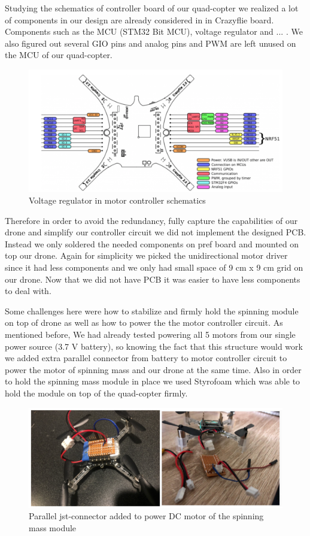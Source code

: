 Studying the schematics of controller board of our quad-copter we realized a lot of components in our design are already considered in in Crazyflie board. Components such as the MCU (STM32 Bit MCU), voltage regulator and ... . We also figured out several GIO pins and analog pins and PWM are left unused on the MCU of our quad-copter. 

\begin{figure}[H]
\centering
\includegraphics[width=1\textwidth]{./Amir_img/cfPinOut.png}
\caption{Voltage regulator in motor controller schematics }
\end{figure} 

Therefore in order to avoid the redundancy, fully capture the capabilities of our drone and simplify our controller circuit we did not implement the designed PCB.   
Instead we only soldered the needed components on pref board and mounted on top our drone. Again for simplicity we picked the unidirectional motor driver since it had less components and we only had small space of 9 cm x 9 cm grid on our drone. Now that we did not have PCB it was easier to have less components to deal with. 

Some challenges here were how to stabilize and firmly hold the spinning module on top of drone as well as how to power the the motor controller circuit.
As mentioned before, We had already tested powering all 5 motors from our single power source (3.7 V battery), so knowing the fact that this structure would work we added extra parallel connector from battery to motor controller circuit to power the motor of spinning mass and our drone at the same time. 
Also in order to hold the spinning mass module in place we used Styrofoam which was able to hold the module on top of the quad-copter firmly. 
\begin{figure}[H]
\centering
\includegraphics[width=1\textwidth]{./Amir_img/jstConnect.png}
\caption{Parallel jst-connector added to power DC motor of the spinning mass module}
\end{figure} 

